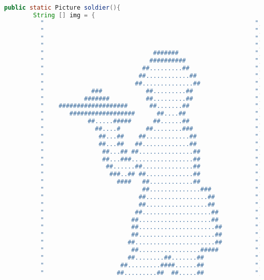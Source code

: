       \begin{lstlisting}[language=java, caption={Representacion en ascii del soldado}]
	public static Picture soldier(){
		String [] img = {
          "                                                          ",
          "                                                          ",
          "                                                          ",
          "                                                          ",
          "                              #######                     ",
          "                             ##########                   ",
          "                           ##.........##                  ",
          "                          ##............##                ",
          "                         ##..............##               ",
          "             ###            ##.........##                 ",
          "           #######          ##.........##                 ",
          "    ###################      ##.......##                  ",
          "       ##################      ##....##                   ",
          "            ##.....#####      ##......##                  ",
          "              ##....#       ##........###                 ",
          "               ##...##    ##............##                ",
          "               ##...##   ##.............##                ",
          "                ##...## ##...............##               ",
          "                ##...###.................##               ",
          "                 ##......##..............##               ",
          "                  ###..## ##.............##               ",
          "                    ####   ##............##               ",
          "                           ##..............###            ",
          "                          ##.................##           ",
          "                          ##.................##           ",
          "                         ##...................##          ",
          "                        ##....................##          ",
          "                        ##.....................##         ",
          "                        ##.....................##         ",
          "                       ##......................##         ",
          "                        ##.................#####          ",
          "                       ##........##.......##              ",
          "                     ##.........####......##              ",
          "                    ##.........##  ##.....##              ",

\end{lstlisting}
